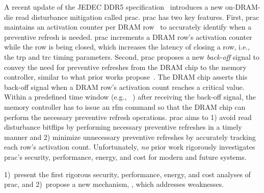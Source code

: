 A recent update  of the JEDEC DDR5 specification~\cite{saroiu2024ddr5, jedec2024jesd795c} introduces a new on-DRAM-die read disturbance mitigation  called \gls{prac}.
\gls{prac} has two key features.
First, \gls{prac} maintains an activation counter per DRAM row~\cite{kim2014flipping} to accurately identify when a preventive refresh is needed.
\gls{prac} increments a DRAM row's activation counter while the row is being closed, which increases the latency of closing a row, i.e., the \gls{trp} and \gls{trc} timing parameters.
Second, \gls{prac} proposes a new \emph{back-off} signal to convey the need for preventive refreshes from the DRAM chip to the memory controller, similar to what prior works propose~\cite{bennett2021panopticon, devaux2021method, yaglikci2021security, hassan2022acase, kim2022mithril, hassan2024self}.
The DRAM chip asserts this back-off signal when a DRAM row's activation count reaches a critical value.
Within a predefined time window (e.g., ~\cite{jedec2024jesd795c}) after receiving the back-off signal, the memory controller has to issue an \gls{rfm} command so that the DRAM chip can perform the necessary preventive refresh operations.
\gls{prac} aims to
1) avoid read disturbance bitflips by performing necessary preventive refreshes in a timely manner and
2) minimize unnecessary preventive refreshes by accurately tracking each row's activation count.
Unfortunately, \emph{no} prior work rigorously investigates \gls{prac}'s security, performance, energy, and  cost  for modern and future systems. 

 1)~present the first rigorous security, performance, energy, and  cost analyses of \gls{prac},  and
2)~propose a new mechanism, \X{}, which addresses  weaknesses.

